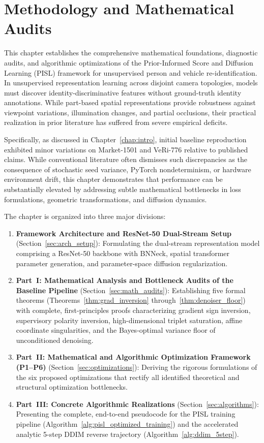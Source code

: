 \chapter{Methodology and Mathematical Audits}
\label{chap:method}
\label{ch:methodology}

This chapter establishes the comprehensive mathematical foundations, diagnostic audits, and algorithmic optimizations of the Prior-Informed Score and Diffusion Learning (PISL) framework for unsupervised person and vehicle re-identification. In unsupervised representation learning across disjoint camera topologies, models must discover identity-discriminative features without ground-truth identity annotations. While part-based spatial representations provide robustness against viewpoint variations, illumination changes, and partial occlusions, their practical realization in prior literature has suffered from severe empirical deficits. 

Specifically, as discussed in Chapter~\ref{chap:intro}, initial baseline reproduction exhibited minor variations on Market-1501 and VeRi-776 relative to published claims. While conventional literature often dismisses such discrepancies as the consequence of stochastic seed variance, PyTorch nondeterminism, or hardware environment drift, this chapter demonstrates that performance can be substantially elevated by addressing subtle mathematical bottlenecks in loss formulations, geometric transformations, and diffusion dynamics.

The chapter is organized into three major divisions:
\begin{enumerate}
    \item \textbf{Framework Architecture and ResNet-50 Dual-Stream Setup} (Section~\ref{sec:arch_setup}): Formulating the dual-stream representation model comprising a ResNet-50 backbone with BNNeck, spatial transformer parameter generation, and parameter-space diffusion regularization.
    \item \textbf{Part~I: Mathematical Analysis and Bottleneck Audits of the Baseline Pipeline} (Section~\ref{sec:math_audits}): Establishing five formal theorems (Theorems~\ref{thm:grad_inversion} through~\ref{thm:denoiser_floor}) with complete, first-principles proofs characterizing gradient sign inversion, supervisory polarity inversion, high-dimensional triplet saturation, affine coordinate singularities, and the Bayes-optimal variance floor of unconditioned denoising.
    \item \textbf{Part~II: Mathematical and Algorithmic Optimization Framework (P1--P6)} (Section~\ref{sec:optimizations}): Deriving the rigorous formulations of the six proposed optimizations that rectify all identified theoretical and structural optimization bottlenecks.
    \item \textbf{Part~III: Concrete Algorithmic Realizations} (Section~\ref{sec:algorithms}): Presenting the complete, end-to-end pseudocode for the PISL training pipeline (Algorithm~\ref{alg:pisl_optimized_training}) and the accelerated analytic 5-step DDIM reverse trajectory (Algorithm~\ref{alg:ddim_5step}).
\end{enumerate}

